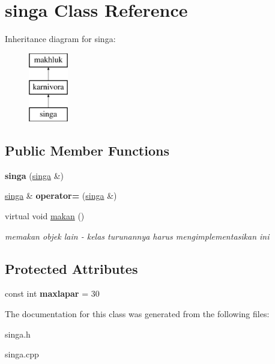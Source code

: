 \hypertarget{classsinga}{}\section{singa Class Reference}
\label{classsinga}
Inheritance diagram for singa\+:\begin{figure}[H]
\begin{center}
\leavevmode
\includegraphics[height=3.000000cm]{classsinga}
\end{center}
\end{figure}
\subsection*{Public Member Functions}
\begin{DoxyCompactItemize}
\item 
{\bfseries singa} (\hyperlink{classsinga}{singa} \&)\hypertarget{classsinga_a4c15695e0ccf73ec7e45545cdb420d95}{}\label{classsinga_a4c15695e0ccf73ec7e45545cdb420d95}

\item 
\hyperlink{classsinga}{singa} \& {\bfseries operator=} (\hyperlink{classsinga}{singa} \&)\hypertarget{classsinga_ad7b992e78a1eefb92f515f646a8deb9b}{}\label{classsinga_ad7b992e78a1eefb92f515f646a8deb9b}

\item 
virtual void \hyperlink{classsinga_a5088d05298bfa251e2a6b8639ccff87a}{makan} ()\hypertarget{classsinga_a5088d05298bfa251e2a6b8639ccff87a}{}\label{classsinga_a5088d05298bfa251e2a6b8639ccff87a}

\begin{DoxyCompactList}\small\item\em memakan objek lain -\/ kelas turunannya harus mengimplementasikan ini \end{DoxyCompactList}\end{DoxyCompactItemize}
\subsection*{Protected Attributes}
\begin{DoxyCompactItemize}
\item 
const int {\bfseries maxlapar} = 30\hypertarget{classsinga_ad887e004abb6137c979cd381bb0b1913}{}\label{classsinga_ad887e004abb6137c979cd381bb0b1913}

\end{DoxyCompactItemize}


The documentation for this class was generated from the following files\+:\begin{DoxyCompactItemize}
\item 
singa.\+h\item 
singa.\+cpp\end{DoxyCompactItemize}
